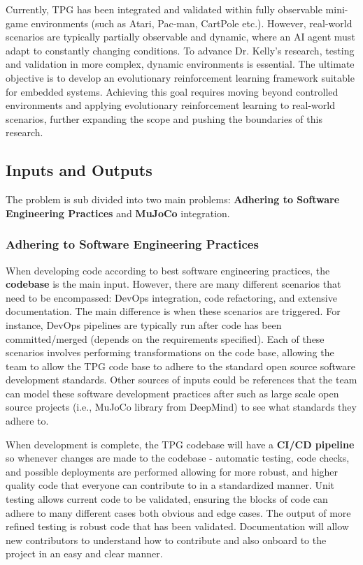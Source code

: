 \documentclass{article}
\begin{document}
Currently, TPG has been integrated and validated within fully observable mini-game environments (such as Atari, Pac-man, CartPole etc.). However, real-world scenarios are typically partially observable and dynamic, where an AI agent must adapt to constantly changing conditions. To advance Dr. Kelly’s research, testing and validation in more complex, dynamic environments is essential. The ultimate objective is to develop an evolutionary reinforcement learning framework suitable for embedded systems. Achieving this goal requires moving beyond controlled environments and applying evolutionary reinforcement learning to real-world scenarios, further expanding the scope and pushing the boundaries of this research.

\subsection{Inputs and Outputs}

The problem is sub divided into two main problems: \textbf{Adhering to Software Engineering Practices} and \textbf{MuJoCo} integration.

\subsubsection{Adhering to Software Engineering Practices}

When developing code according to best software engineering practices, the \textbf{codebase} is the main input. However, there are many different scenarios that need to be encompassed: DevOps integration, code refactoring, and extensive documentation. The main difference is when these scenarios are triggered. For instance, DevOps pipelines are typically run after code has been committed/merged (depends on the requirements specified). Each of these scenarios involves performing transformations on the code base, allowing the team to allow the TPG code base to adhere to the standard open source software development standards. Other sources of inputs could be references that the team can model these software development practices after such as large scale open source projects (i.e., MuJoCo library from DeepMind) to see what standards they adhere to. 

When development is complete, the TPG codebase will have a \textbf{CI/CD pipeline} so whenever changes are made to the codebase - automatic testing, code checks, and possible deployments are performed allowing for more robust, and higher quality code that everyone can contribute to in a standardized manner. Unit testing allows current code to be validated, ensuring the blocks of code can adhere to many different cases both obvious and edge cases. The output of more refined testing is robust code that has been validated. Documentation will allow new contributors to understand how to contribute and also onboard to the project in an easy and clear manner.
\end{document}
